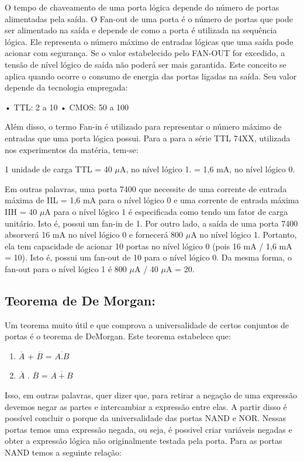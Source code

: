 \documentclass[12pt]{article}
\begin{document}
O tempo de chaveamento de uma porta lógica depende do número de portas alimentadas pela saída. O Fan-out de uma porta é o número de portas que pode ser alimentado na saída e depende de como a porta é utilizada na sequência lógica. Ele representa o número máximo de entradas lógicas que uma saída pode acionar com segurança. Se o valor estabelecido pelo FAN-OUT for excedido, a tensão de nível lógico de saída não poderá ser mais garantida. Este conceito se aplica quando ocorre o consumo de energia das portas ligadas na saída. Seu valor depende da tecnologia empregada: 

• TTL: 2 a 10 
• CMOS: 50 a 100

Além disso, o termo Fan-in é utilizado para representar o número máximo de entradas que uma porta lógica possui. Para a para a série TTL 74XX, utilizada nos experimentos da matéria, tem-se: 

1 unidade de carga TTL = 40 $\mu$A, no nível lógico 1. 
= 1,6 mA, no nível lógico 0. 

Em outras palavras, uma porta 7400 que necessite de uma corrente de entrada máxima de IIL = 1,6 mA para o nível lógico 0 e uma corrente de entrada máxima IIH = 40 $\mu$A para o nível lógico 1 é especificada como tendo um fator de carga unitário. Isto é, possui um fan-in de 1. Por outro lado, a saída de uma porta 7400 absorverá 16 mA no nível lógico 0 e fornecerá 800 $\mu$A no nível lógico 1. Portanto, ela tem capacidade de acionar 10 portas no nível lógico 0 (pois 16 mA / 1,6 mA = 10). Isto é, possui um fan-out de 10 para o nível lógico 0. Da mesma forma, o fan-out para o nível lógico 1 é 800 $\mu$A / 40 $\mu$A = 20.


\subsection{Teorema de De Morgan:}

Um teorema muito útil e que comprova a universalidade de certos conjuntos de portas é o teorema de DeMorgan. Este teorema estabelece que:

\begin{enumerate}
	\item $\overline{A}$ + $\overline{B}$ = $\overline{A.B}$
	\item $\overline{A}$ . $\overline{B}$ = $\overline{A+B}$
\end{enumerate}

Isso, em outras palavras, quer dizer que, para retirar a negação de uma expressão devemos negar as partes e intercambiar a expressão entre elas. A partir disso é possível concluir o porque da universalidade das portas NAND e NOR. Nessas portas temos uma expressão negada, ou seja, é possivel criar variáveis negadas e obter a expressão lógica não originalmente testada pela porta. Para as portas NAND temos a seguinte relação:
\end{document}
